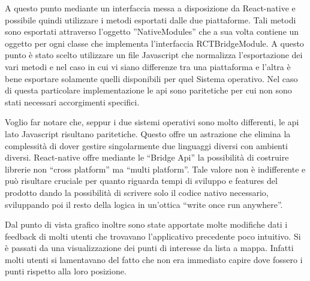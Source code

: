 A questo punto mediante un interfaccia messa a disposizione da React-native e possibile quindi utilizzare i metodi esportati dalle due piattaforme. Tali metodi sono esportati attraverso l’oggetto ”NativeModules” che a sua volta contiene un oggetto per ogni classe che implementa l’interfaccia RCTBridgeModule. A questo punto è stato scelto utilizzare un file Javascript che normalizza l’esportazione dei vari metodi e nel caso in cui vi siano differenze tra una piattaforma e l’altra è bene esportare solamente quelli disponibili per quel Sistema operativo. Nel caso di questa particolare implementazione le api sono paritetiche per cui non sono stati necessari accorgimenti specifici.\vspace{5mm}

Voglio far notare che, seppur i due sistemi operativi sono molto differenti, le api lato Javascript risultano paritetiche. Questo offre un astrazione che elimina la complessità di dover gestire singolarmente due linguaggi diversi con ambienti diversi. React-native offre mediante le “Bridge Api” la possibilità di costruire librerie non “cross platform” ma “multi platform”. Tale valore non è indifferente e può risultare cruciale per quanto riguarda tempi di sviluppo e features del prodotto dando la possibilità di scrivere solo il codice nativo necessario, sviluppando poi il resto della logica in un'ottica “write once run anywhere”.\vspace{5mm}

Dal punto di vista grafico inoltre sono state apportate molte modifiche dati i feedback di molti utenti che trovavano l’applicativo precedente poco intuitivo. Si è passati da una visualizzazione dei punti di interesse da lista a mappa. Infatti molti utenti si lamentavano del fatto che non era immediato capire dove fossero i punti rispetto alla loro posizione.\vspace{5mm}

